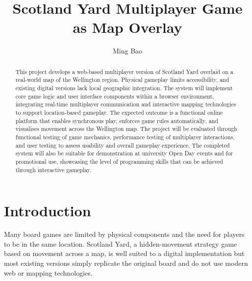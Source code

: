 \documentclass[11pt, a4paper, twoside, openright]{article}
\title{Scotland Yard Multiplayer Game as Map Overlay}
\author{Ming Bao}
\date{}
\begin{document}
	
	\frontmatter
	
	
	\begin{abstract}
	This project develops a web-based multiplayer version of Scotland Yard overlaid on a real-world map of the Wellington region. Physical gameplay limits accessibility, and existing digital versions lack local geographic integration. The system will implement core game logic and user interface components within a browser environment, integrating real-time multiplayer communication and interactive mapping technologies to support location-based gameplay. The expected outcome is a functional online platform that enables synchronous play, enforces game rules automatically, and visualises movement across the Wellington map. The project will be evaluated through functional testing of game mechanics, performance testing of multiplayer interactions, and user testing to assess usability and overall gameplay experience. The completed system will also be suitable for demonstration at university Open Day events and for promotional use, showcasing the level of programming skills that can be achieved through interactive gameplay.
	\end{abstract}
	
	\maketitle
	
	
	
	\mainmatter
	
	
	
	\section{Introduction}
	
	Many board games are limited by physical components and the need for players to be in the same location. Scotland Yard, a hidden-movement strategy game based on movement across a map, is well suited to a digital implementation but most existing versions simply replicate the original board and do not use modern web or mapping technologies.
	
\end{document}
